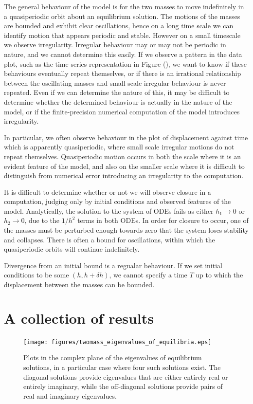 \documentclass{report}
\begin{document}
The general behaviour of the model is for the two masses to move indefinitely in a quasiperiodic orbit about an equilibrium solution.
The motions of the masses are bounded and exhibit clear oscillations,
hence on a long time scale we can identify motion that appears periodic and stable.
However on a small timescale we observe irregularity.
Irregular behaviour may or may not be periodic in nature, and we cannot determine this easily.
If we observe a pattern in the data plot, such as the time-series representation in Figure (), %
we want to know if these behaviours eventually repeat themselves,
or if there is an irrational relationship between the oscillating masses and small scale irregular behaviour is never repeated.
Even if we can determine the nature of this,
it may be difficult to determine whether the determined behaviour is actually in the nature of the model,
or if the finite-precision numerical computation of the model introduces irregularity.

In particular, we often observe behaviour in the plot of displacement against time which is apparently quasiperiodic,
where small scale irregular motions do not repeat themselves.
Quasiperiodic motion occurs in both the scale where it is an evident feature of the model,
and also on the smaller scale where it is difficult to distinguish from numerical error introducing an irregularity to the computation.

It is difficult to determine whether or not we will observe closure in a computation,
judging only by initial conditions and observed features of the model.
Analytically, the solution to the system of ODEs fails as either \(h_1\rightarrow 0\) or \(h_2 \rightarrow 0\),
due to the \(1/h^2\) terms in both ODEs.
In order for closure to occur,
one of the masses must be perturbed enough towards zero that the system loses stability and collapses.
There is often a bound for oscillations, within which the quasiperiodic orbits will continue indefinitely.

Divergence from an initial bound is a regualar behaviour.
If we set initial conditions to be some \((h,h+\delta h)\),
we cannot specify a time $T$ up to which the displacement between the masses can be bounded.

\section{A collection of results}

\begin{figure}
    \centering
    \texttt{[image: figures/twomass\_eigenvalues\_of\_equilibria.eps]}
    \caption{
        Plots in the complex plane of the eigenvalues of equilibrium solutions,
        in a particular case where four such solutions exist.
        The diagonal solutions provide eigenvalues that are either entirely real or entirely imaginary,
        while the off-diagonal solutions provide pairs of real and imaginary eigenvalues.
    }
    \label{fig:twomass_argand_eigenvalues}
\end{figure}
\end{document}
